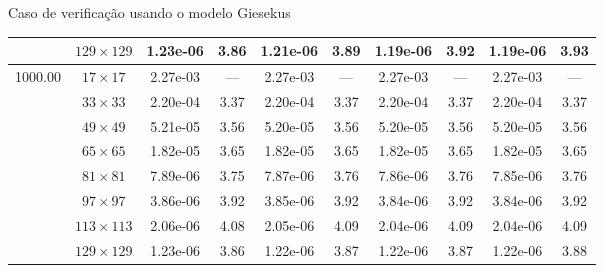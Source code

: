 \begin{frame}{Caso de verificação usando o modelo Giesekus}
\begin{table}[H]
{\begin{tabular*}{\textwidth}{@{\extracolsep\fill}cccccccccc@{}}
    & $129\times 129$ & 1.23e-06 & 3.86 & 1.21e-06 & 3.89 & 1.19e-06 & 3.92 & 1.19e-06 & 3.93 \\
    \hline
    \multirow{7}{*}{1000.00} & $17\times 17$ & 2.27e-03 & --- & 2.27e-03 & --- & 2.27e-03 & --- & 2.27e-03 & --- \\
    & $33\times 33$ & 2.20e-04 & 3.37 & 2.20e-04 & 3.37 & 2.20e-04 & 3.37 & 2.20e-04 & 3.37 \\
    & $49\times 49$ & 5.21e-05 & 3.56 & 5.20e-05 & 3.56 & 5.20e-05 & 3.56 & 5.20e-05 & 3.56 \\
    & $65\times 65$ & 1.82e-05 & 3.65 & 1.82e-05 & 3.65 & 1.82e-05 & 3.65 & 1.82e-05 & 3.65 \\
    & $81\times 81$ & 7.89e-06 & 3.75 & 7.87e-06 & 3.76 & 7.86e-06 & 3.76 & 7.85e-06 & 3.76 \\
    & $97\times 97$ & 3.86e-06 & 3.92 & 3.85e-06 & 3.92 & 3.84e-06 & 3.92 & 3.84e-06 & 3.92 \\
    & $113\times 113$ & 2.06e-06 & 4.08 & 2.05e-06 & 4.09 & 2.04e-06 & 4.09 & 2.04e-06 & 4.09 \\
    & $129\times 129$ & 1.23e-06 & 3.86 & 1.22e-06 & 3.87 & 1.22e-06 & 3.87 & 1.22e-06 & 3.88 \\
    \hline
    \end{tabular*}
}
\end{table}
\end{frame}

